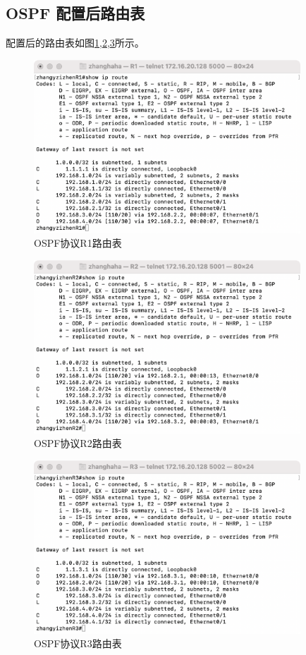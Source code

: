 \documentclass[a4paper,12pt]{report}
\begin{document}
\begin{spacing}{1.5}
\subsection{OSPF 配置后路由表}
配置后的路由表如图\ref{30},\ref{31},\ref{32}所示。
\begin{figure}[htb!]
  \centering
\includegraphics[width=10cm]{figure/ospf-r1-route.png}
  \caption{OSPF协议R1路由表}
  \label{30}

\end{figure}

\begin{figure}[htb!]
  \centering
\includegraphics[width=10cm]{figure/ospf-r2-route.png}
\caption{OSPF协议R2路由表}
\label{31}
\end{figure}

\begin{figure}[htb!]
  \centering
\includegraphics[width=10cm]{figure/ospf-r3-route.png}
\caption{ OSPF协议R3路由表}
\label{32}
\end{figure}


\end{spacing}
\end{document}
